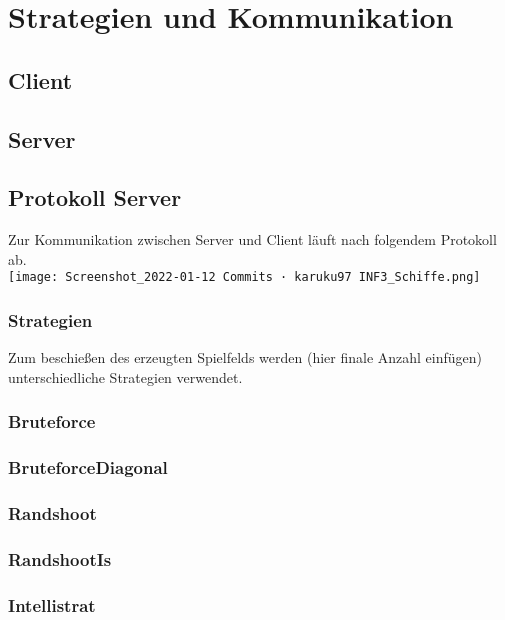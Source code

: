 \section*{Strategien und Kommunikation}

\subsection*{Client}




\subsection*{Server}

\subsection*{Protokoll Server}
Zur Kommunikation zwischen Server und Client läuft nach folgendem Protokoll ab.\\
\texttt{[image: Screenshot\_2022-01-12 Commits · karuku97 INF3\_Schiffe.png]}
\\
\subsubsection*{Strategien}
Zum beschießen des erzeugten Spielfelds werden (hier finale Anzahl einfügen) unterschiedliche Strategien verwendet.

\subsubsection*{Bruteforce}

\subsubsection*{BruteforceDiagonal}

\subsubsection*{Randshoot}

\subsubsection*{RandshootIs}

\subsubsection*{Intellistrat}

